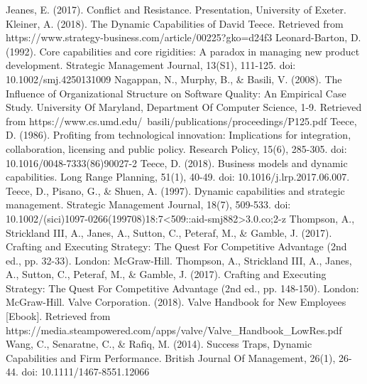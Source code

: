 \documentclass[11pt]{article}
\begin{document}
\newline \newline
Jeanes, E. (2017). Conflict and Resistance. Presentation, University of Exeter.
\newline \newline
Kleiner, A. (2018). The Dynamic Capabilities of David Teece. Retrieved from https://www.strategy-business.com/article/00225?gko=d24f3
\newline \newline
Leonard-Barton, D. (1992). Core capabilities and core rigidities: A paradox in managing new product development. Strategic Management Journal, 13(S1), 111-125. doi: 10.1002/smj.4250131009
\newline \newline
Nagappan, N., Murphy, B., \& Basili, V. (2008). The Influence of Organizational Structure on Software Quality: An Empirical Case Study. University Of Maryland, Department Of Computer Science, 1-9. Retrieved from https://www.cs.umd.edu/~basili/publications/proceedings/P125.pdf
\newline \newline
Teece, D. (1986). Profiting from technological innovation: Implications for integration, collaboration, licensing and public policy. Research Policy, 15(6), 285-305. doi: 10.1016/0048-7333(86)90027-2
\newline \newline
Teece, D. (2018). Business models and dynamic capabilities. Long Range Planning, 51(1), 40-49. doi: 10.1016/j.lrp.2017.06.007.
\newline \newline
Teece, D., Pisano, G., \& Shuen, A. (1997). Dynamic capabilities and strategic management. Strategic Management Journal, 18(7), 509-533. doi: 10.1002/(sici)1097-0266(199708)18:7<509::aid-smj882>3.0.co;2-z
\newline \newline
Thompson, A., Strickland III, A., Janes, A., Sutton, C., Peteraf, M., \& Gamble, J. (2017). Crafting and Executing Strategy: The Quest For Competitive Advantage (2nd ed., pp. 32-33). London: McGraw-Hill.
\newline \newline
Thompson, A., Strickland III, A., Janes, A., Sutton, C., Peteraf, M., \& Gamble, J. (2017). Crafting and Executing Strategy: The Quest For Competitive Advantage (2nd ed., pp. 148-150). London: McGraw-Hill.
\newline \newline
Valve Corporation. (2018). Valve Handbook for New Employees [Ebook]. Retrieved from \newline https://media.steampowered.com/apps/valve/Valve\_Handbook\_LowRes.pdf
\newline \newline
Wang, C., Senaratne, C., \& Rafiq, M. (2014). Success Traps, Dynamic Capabilities and Firm Performance. British Journal Of Management, 26(1), 26-44. doi: 10.1111/1467-8551.12066
\end{document}
